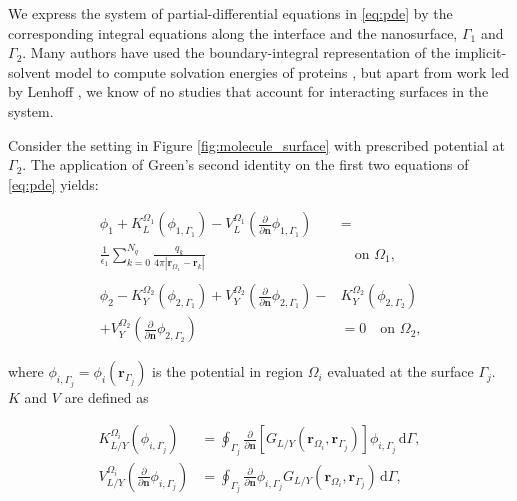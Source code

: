 


We express the system of partial-differential equations in  \eqref{eq:pde} by the corresponding integral equations along the interface and the nanosurface, $\Gamma_1$ and $\Gamma_2$. Many authors have used the boundary-integral representation of the implicit-solvent model to compute solvation energies of proteins \cite{YoonLenhoff1990, Juffer1991a, LuETal2006, BajajETal2011, AltmanBardhanWhiteTidor09, GengKrasny2013, CooperBardhanBarba2013}, but apart from work led by Lenhoff \cite{YoonLenhoff1992}, we know of no studies that account for interacting surfaces in the system. 

Consider the setting in Figure \ref{fig:molecule_surface} with prescribed potential at $\Gamma_2$. The application of Green's second identity on the first two equations of \eqref{eq:pde} yields:

\begin{align} \label{eq:green_identity}
\phi_{1}+ K_{L}^{\Omega_1}(\phi_{1,\Gamma_1}) -  V_{L}^{\Omega_1} \left(\frac{\partial}{\partial \mathbf{n}}  \phi_{1,\Gamma_1}  \right) &  = \nonumber\\
 \frac{1}{\epsilon_1} \sum_{k=0}^{N_q}  \frac{q_k}{4\pi|\mathbf{r}_{\Omega_1} - \mathbf{r}_k|} &  \quad \text{on $\Omega_1$,} \nonumber \\ \nonumber \\
\phi_{2} - K_{Y}^{\Omega_2}(\phi_{2,\Gamma_1}) + V_{Y}^{\Omega_2} \left( \frac{\partial}{\partial \mathbf{n}} \phi_{2,\Gamma_1} \right) - & K_{Y}^{\Omega_2}(\phi_{2,\Gamma_2})  \nonumber \\
 + V_{Y}^{\Omega_2}  \left( \frac{\partial}{\partial \mathbf{n}} \phi_{2,\Gamma_2} \right) & = 0 \quad \text{on $\Omega_2$,}
\end{align}

\noindent where $\phi_{i,\Gamma_j} = \phi_i(\mathbf{r}_{\Gamma_j})$ is the potential in region $\Omega_i$ evaluated at the surface $\Gamma_j$. $K$ and $V$ are defined as

%
\begin{align} \label{eq:layers}
K_{L/Y}^{\Omega_i}(\phi_{i,\Gamma_j}) &= \oint_{\Gamma_j} \frac{\partial}{\partial \mathbf{n}} \left[ G_{L/Y}(\mathbf{r}_{\Omega_i},\mathbf{r}_{\Gamma_j}) \right]\phi_{i,\Gamma_j} \, \mathrm{d} \Gamma, \nonumber \\
V_{L/Y}^{\Omega_i} \left( \frac{\partial}{\partial \mathbf{n}} \phi_{i,\Gamma_j} \right) &= \oint_{\Gamma_j} \frac{\partial}{\partial \mathbf{n}} \phi_{i,\Gamma_j} G_{L/Y}(\mathbf{r}_{\Omega_i},\mathbf{r}_{\Gamma_j})  \, \mathrm{d} \Gamma,
\end{align}

